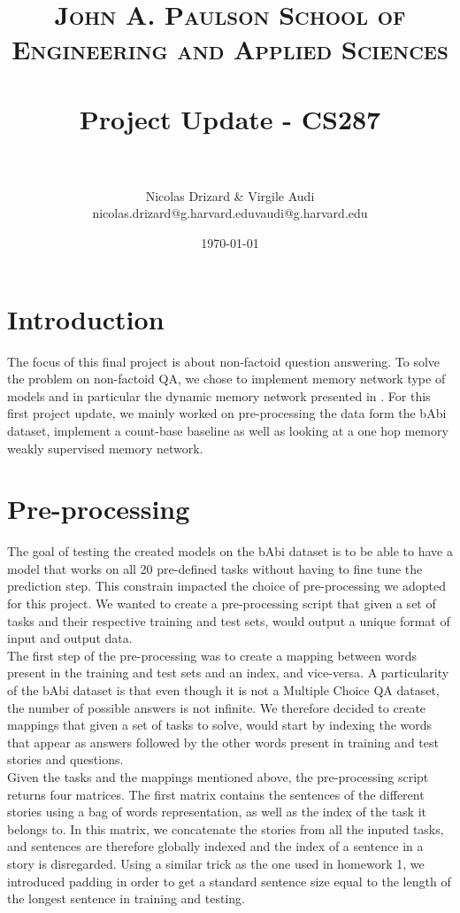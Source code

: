 \documentclass[paper=a4, fontsize=11pt]{scrartcl} %
\title{	
\normalfont \normalsize 
\textsc{John A. Paulson School of Engineering and Applied Sciences} \\ [25pt] %
\horrule{0.5pt} \\[0.4cm] %
\huge Project Update - CS287 \\ %
\horrule{2pt} \\[0.5cm] %
}
\author{Nicolas Drizard \& Virgile Audi\\
nicolas.drizard@g.harvard.edu\quad vaudi@g.harvard.edu} %
\date{\normalsize\today} %
\numberwithin{equation}{section} %
\numberwithin{figure}{section} %
\numberwithin{table}{section} %
\begin{document}
\maketitle %


\section*{Introduction}

The focus of this final project is about non-factoid question answering. To solve the problem on non-factoid QA, we chose to implement memory network type of models and in particular the dynamic memory network presented in \cite{dmn}. For this first project update, we mainly worked on pre-processing the data form the bAbi dataset, implement a count-base baseline as well as looking at a one hop memory weakly supervised memory network.



\section{Pre-processing}

The goal of testing the created models on the bAbi dataset is to be able to have a model that works on all 20 pre-defined tasks without having to fine tune the prediction step. This constrain impacted the choice of pre-processing we adopted for this project. We wanted to create a pre-processing script that given a set of tasks and their respective training and test sets, would output a unique format of input and output data.\\

The first step of the pre-processing was to create a mapping between words present in the training and test sets and an index, and vice-versa. A particularity of the bAbi dataset is that even though it is not a Multiple Choice QA dataset, the number of possible answers is not infinite. We therefore decided to create mappings that given a set of tasks to solve, would start by indexing the words that appear as answers followed by the other words present in training and test stories and questions.\\

Given the tasks and the mappings mentioned above, the pre-processing script returns four matrices. The first matrix contains the sentences of the different stories using a bag of words representation, as well as the index of the task it belongs to. In this matrix, we concatenate the stories from all the inputed tasks, and sentences are therefore globally indexed and the index of a sentence in a story is disregarded. Using a similar trick as the one used in homework 1, we introduced padding in order to get a standard sentence size equal to the length of the longest sentence in training and testing.\\
\end{document}
